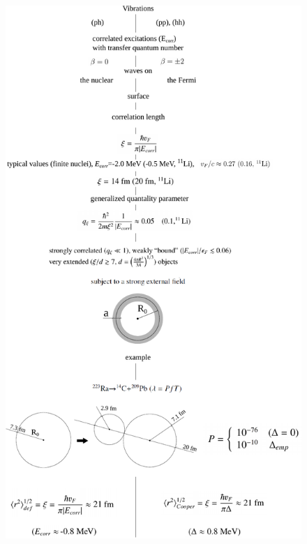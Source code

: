        \begin{figure}
       	\centerline{\includegraphics*[width=13cm,angle=0	]{nutshell/figs/fig3B3x}}
       	\caption{}\label{fig3B3x}
       \end{figure}
